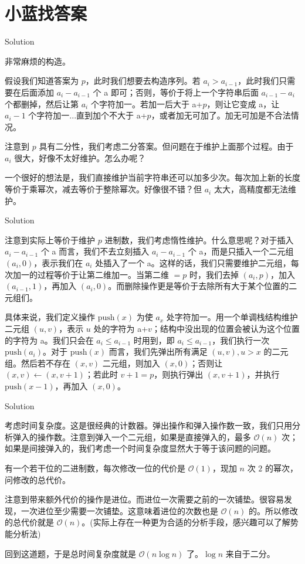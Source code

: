 \section{小蓝找答案}

\begin{frame}{Solution}

非常麻烦的构造。

假设我们知道答案为 $p$，此时我们想要去构造序列。若 $a_i>a_{i-1}$，此时我们只需要在后面添加 $a_i-a_{i-1}$ 个 a 即可；否则，等价于将上一个字符串后面 $a_{i-1}-a_i$ 个都删掉，然后让第 $a_{i}$ 个字符加一。若加一后大于 a+$p$，则让它变成 a，让 $a_i-1$ 个字符加一...直到加个不大于 a+$p$，或者加无可加了。加无可加是不合法情况。

注意到 $p$ 具有二分性，我们考虑二分答案。但问题在于维护上面那个过程。由于 $a_i$ 很大，好像不太好维护。怎么办呢？

一个很好的想法是，我们直接维护当前字符串还可以加多少次。每次加上新的长度等价于乘幂次，减去等价于整除幂次。好像很不错？但 $a_i$ 太大，高精度都无法维护。

\end{frame}
\begin{frame}{Solution}

注意到实际上等价于维护 $p$ 进制数，我们考虑惰性维护。什么意思呢？对于插入 $a_i-a_{i-1}$ 个 a 而言，我们不去立刻插入 $a_i-a_{i-1}$ 个 a，而是只插入一个二元组 $(a_i,0)$，表示我们在 $a_i$ 处插入了一个 a。这样的话，我们只需要维护二元组，每次加一的过程等价于让第二维加一。当第二维 $=p$ 时，我们去掉 $(a_i,p)$，加入 $(a_{i-1},1)$，再加入 $(a_i,0)$。而删除操作更是等价于去除所有大于某个位置的二元组们。

具体来说，我们定义操作 $\mathrm{push}(x)$ 为使 $a_x$ 处字符加一。用一个单调栈结构维护二元组 $(u,v)$，表示 $u$ 处的字符为 a+$v$；结构中没出现的位置会被认为这个位置的字符为 a。我们只会在 $a_i\leq a_{i-1}$ 时用到，即 $a_i\leq a_{i-1}$，我们执行一次 $\mathrm{push}(a_i)$。对于 $\mathrm{push}(x)$ 而言，我们先弹出所有满足 $(u,v), u>x$ 的二元组。然后若不存在 $(x,v)$ 二元组，则加入 $(x,0)$；否则让 $(x,v)\leftarrow (x,v+1)$；若此时 $v+1=p$，则执行弹出 $(x,v+1)$，并执行 $\mathrm{push}(x-1)$，再加入 $(x,0)$。

\end{frame}
\begin{frame}{Solution}

考虑时间复杂度。这是很经典的计数器。弹出操作和弹入操作数一致，我们只用分析弹入的操作数。注意到弹入一个二元组，如果是直接弹入的，最多 $\mathcal O(n)$ 次；如果是间接弹入的，我们考虑一个时间复杂度显然大于等于该问题的问题。

有一个若干位的二进制数，每次修改一位的代价是 $\mathcal O(1)$，现加 $n$ 次 $2$ 的幂次，问修改的总代价。

注意到带来额外代价的操作是进位。而进位一次需要之前的一次铺垫。很容易发现，一次进位至少需要一次铺垫。这意味着进位的次数也是 $\mathcal O(n)$ 的。所以修改的总代价就是 $\mathcal O(n)$。(实际上存在一种更为合适的分析手段，感兴趣可以了解势能分析法)

回到这道题，于是总时间复杂度就是 $\mathcal O(n\log n)$ 了。$\log n$ 来自于二分。

\end{frame}